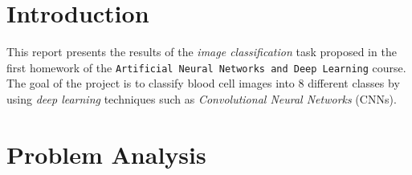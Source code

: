 \documentclass[11pt]{article}
\begin{document}
\begin{multicols}{2}

      \section{Introduction}


      This report presents the results of the \textit{image classification}
      task proposed in the first homework of the \texttt{Artificial Neural Networks and Deep Learning} course. The goal of the project is to classify blood cell images into 8 different classes by using \textit{deep learning} techniques such as \textit{Convolutional Neural Networks} (CNNs)\cite{NIPS1989_53c3bce6}.

      \section{Problem Analysis}


\end{multicols}
\end{document}
